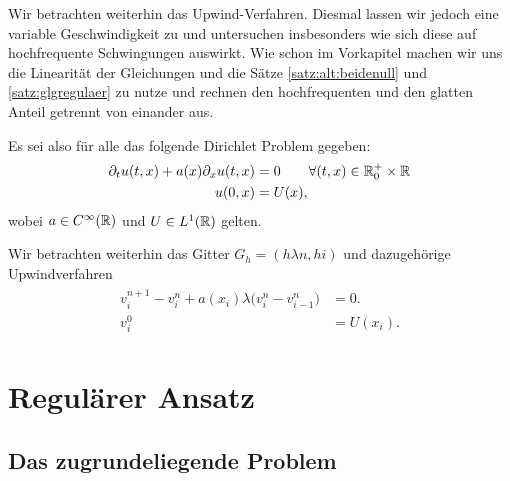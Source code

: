 
Wir betrachten weiterhin das Upwind-Verfahren. Diesmal lassen wir jedoch eine
variable Geschwindigkeit zu und untersuchen insbesonders wie sich diese auf
hochfrequente Schwingungen auswirkt. Wie schon im Vorkapitel machen wir uns die
Linearität der Gleichungen und die Sätze \ref{satz:alt:beidenull} und
\ref{satz:glgregulaer} zu nutze und rechnen den hochfrequenten und den glatten
Anteil getrennt von einander aus.

Es sei also für alle das folgende Dirichlet Problem gegeben:
\begin{align}\label{eq:varadv:pde}
\begin{split}
\partial_t u(t, x) + a(x) \partial_x u(t, x) &= 0 \qquad \forall (t, x) \in \mathbb R^+_0 \times \mathbb R\\
u(0, x) &= U(x),
\end{split}
\end{align}
wobei $a \in C^\infty(\mathbb R)$ und $U \in L^1(\mathbb R)$ gelten.

Wir betrachten weiterhin das Gitter $G_h = (h \lambda n, h i)$ und dazugehörige
Upwindverfahren
\begin{align}\label{eq:varadv:verfahren}
\begin{split}
v^{n+1}_i - v^n_i + a(x_i) \lambda \bigl( v^n_i - v^n_{i-1} \bigr) &= 0.\\
v^0_i &= U(x_i).
\end{split}
\end{align}

\section{Regulärer Ansatz}

\subsection*{Das zugrundeliegende Problem}


